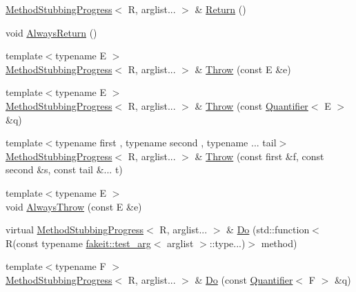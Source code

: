 \begin{DoxyCompactItemize}
\item 
\mbox{\hyperlink{structfakeit_1_1MethodStubbingProgress}{Method\+Stubbing\+Progress}}$<$ R, arglist... $>$ \& \mbox{\hyperlink{structfakeit_1_1MethodStubbingProgress_a4743b7e25e98cd6a2be2c03b7a9416d4}{Return}} ()
\item 
void \mbox{\hyperlink{structfakeit_1_1MethodStubbingProgress_a3f1ecf87f8c73b7f3276786914579f8b}{Always\+Return}} ()
\item 
{\footnotesize template$<$typename E $>$ }\\\mbox{\hyperlink{structfakeit_1_1MethodStubbingProgress}{Method\+Stubbing\+Progress}}$<$ R, arglist... $>$ \& \mbox{\hyperlink{structfakeit_1_1MethodStubbingProgress_ae3da30d02ba5de4bfa82f51bba5602c3}{Throw}} (const E \&e)
\item 
{\footnotesize template$<$typename E $>$ }\\\mbox{\hyperlink{structfakeit_1_1MethodStubbingProgress}{Method\+Stubbing\+Progress}}$<$ R, arglist... $>$ \& \mbox{\hyperlink{structfakeit_1_1MethodStubbingProgress_a93c74210adfc0ec4662aff15f78834c7}{Throw}} (const \mbox{\hyperlink{structfakeit_1_1Quantifier}{Quantifier}}$<$ E $>$ \&q)
\item 
{\footnotesize template$<$typename first , typename second , typename ... tail$>$ }\\\mbox{\hyperlink{structfakeit_1_1MethodStubbingProgress}{Method\+Stubbing\+Progress}}$<$ R, arglist... $>$ \& \mbox{\hyperlink{structfakeit_1_1MethodStubbingProgress_a516a0ade529c61e4ab6df1bf47f3f1b2}{Throw}} (const first \&f, const second \&s, const tail \&... t)
\item 
{\footnotesize template$<$typename E $>$ }\\void \mbox{\hyperlink{structfakeit_1_1MethodStubbingProgress_a4efb736b0529123d9c5ed87630e11ac2}{Always\+Throw}} (const E \&e)
\item 
virtual \mbox{\hyperlink{structfakeit_1_1MethodStubbingProgress}{Method\+Stubbing\+Progress}}$<$ R, arglist... $>$ \& \mbox{\hyperlink{structfakeit_1_1MethodStubbingProgress_a9ef4c2db8e567aa312b708613d240ae1}{Do}} (std\+::function$<$ R(const typename \mbox{\hyperlink{structfakeit_1_1test__arg}{fakeit\+::test\+\_\+arg}}$<$ arglist $>$\+::type...)$>$ method)
\item 
{\footnotesize template$<$typename F $>$ }\\\mbox{\hyperlink{structfakeit_1_1MethodStubbingProgress}{Method\+Stubbing\+Progress}}$<$ R, arglist... $>$ \& \mbox{\hyperlink{structfakeit_1_1MethodStubbingProgress_a59f9d7ab7c86b809ce25b41d05b58ad2}{Do}} (const \mbox{\hyperlink{structfakeit_1_1Quantifier}{Quantifier}}$<$ F $>$ \&q)

\end{DoxyCompactItemize}
